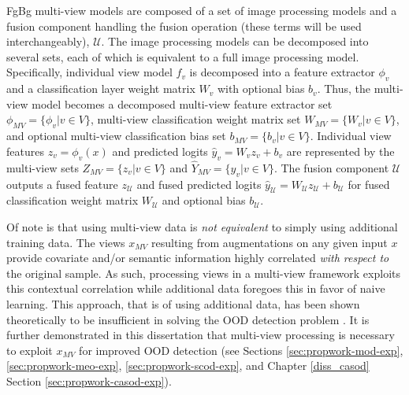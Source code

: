 FgBg multi-view models are composed of a set of image processing models and a fusion component handling the fusion operation (these terms will be used interchangeably), $\mathcal{U}$. The image processing models can be decomposed into several sets, each of which is equivalent to a full image processing model. Specifically, individual view model $f_v$ is decomposed into a feature extractor $\phi_v$ and a classification layer weight matrix $W_v$ with optional bias $b_v$. Thus, the multi-view model becomes a decomposed multi-view feature extractor set $\phi_{MV} = \{\phi_v | v \in V\}$, multi-view classification weight matrix set $W_{MV} = \{W_v | v \in V\}$, and optional multi-view classification bias set $b_{MV} = \{b_v | v \in V\}$. Individual view features $z_v = \phi_v(x)$ and predicted logits $\hat{y}_v = W_v z_v + b_v$ are represented by the multi-view sets $Z_{MV} = \{z_v | v \in V\}$ and $\hat{Y}_{MV} = \{\hat{y}_v | v \in V\}$. The fusion component $\mathcal{U}$ outputs a fused feature $z_{\mathcal{U}}$ and fused predicted logits $\hat{y}_{\mathcal{U}} = W_{\mathcal{U}} z_{\mathcal{U}} + b_{\mathcal{U}}$ for fused classification weight matrix $W_{\mathcal{U}}$ and optional bias $b_{\mathcal{U}}$.

Of note is that using multi-view data is \textit{not equivalent} to simply using additional training data. The views $x_{MV}$ resulting from augmentations on any given input $x$ provide covariate and/or semantic information highly correlated \textit{with respect to} the original sample. As such, processing views in a multi-view framework exploits this contextual correlation while additional data foregoes this in favor of naive learning. This approach, that is of using additional data, has been shown theoretically to be insufficient in solving the OOD detection problem \cite{fang2022out}. It is further demonstrated in this dissertation that multi-view processing is necessary to exploit $x_{MV}$ for improved OOD detection (see Sections \ref{sec:propwork-mod-exp}, \ref{sec:propwork-meo-exp}, \ref{sec:propwork-scod-exp}, and Chapter \ref{diss_casod} Section \ref{sec:propwork-casod-exp}).

